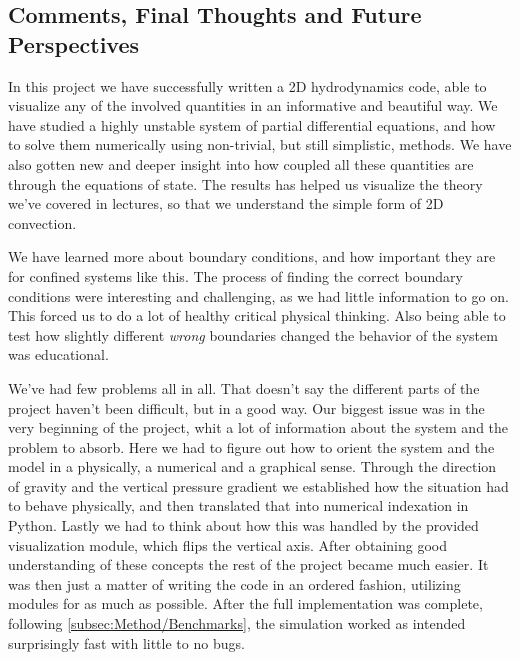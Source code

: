 \documentclass[11pt,a4paper,twocolumn,titlepage]{article}
\begin{document}
\subsection{Comments, Final Thoughts and Future Perspectives}\label{subsec:Conclusion/Comments}
In this project we have successfully written a 2D hydrodynamics code, able to visualize any of the involved quantities in an informative and beautiful way. We have studied a highly unstable system of partial differential equations, and how to solve them numerically using non-trivial, but still simplistic, methods. We have also gotten new and deeper insight into how coupled all these quantities are through the equations of state. The results has helped us visualize the theory we've covered in lectures, so that we understand the simple form of 2D convection.

We have learned more about boundary conditions, and how important they are for confined systems like this. The process of finding the correct boundary conditions were interesting and challenging, as we had little information to go on. This forced us to do a lot of healthy critical physical thinking. Also being able to test how slightly different \textit{wrong} boundaries changed the behavior of the system was educational.

We've had few problems all in all. That doesn't say the different parts of the project haven't been difficult, but in a good way. Our biggest issue was in the very beginning of the project, whit a lot of information about the system and the problem to absorb. Here we had to figure out how to orient the system and the model in a physically, a numerical and a graphical sense. Through the direction of gravity and the vertical pressure gradient we established how the situation had to behave physically, and then translated that into numerical indexation in Python. Lastly we had to think about how this was handled by the provided visualization module, which flips the vertical axis. After obtaining good understanding of these concepts the rest of the project became much easier. It was then just a matter of writing the code in an ordered fashion, utilizing modules for as much as possible. After the full implementation was complete, following \cref{subsec:Method/Benchmarks}, the simulation worked as intended surprisingly fast with little to no bugs.
\end{document}
